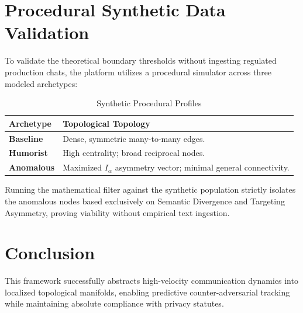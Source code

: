 \section{Procedural Synthetic Data Validation}

To validate the theoretical boundary thresholds without ingesting regulated production chats, the platform utilizes a procedural simulator across three modeled archetypes:

\begin{table}[h]
\centering
\begin{tabular}{p{2cm} p{5cm}}
\toprule
\textbf{Archetype} & \textbf{Topological Topology} \\
\midrule
\textbf{Baseline} & Dense, symmetric many-to-many edges. \\
\textbf{Humorist} & High centrality; broad reciprocal nodes. \\
\textbf{Anomalous} & Maximized $I_\alpha$ asymmetry vector; minimal general connectivity. \\
\bottomrule
\end{tabular}
\caption{Synthetic Procedural Profiles}
\end{table}

Running the mathematical filter against the synthetic population strictly isolates the anomalous nodes based exclusively on Semantic Divergence and Targeting Asymmetry, proving viability without empirical text ingestion.

\section{Conclusion}
This framework successfully abstracts high-velocity communication dynamics into localized topological manifolds, enabling predictive counter-adversarial tracking while maintaining absolute compliance with privacy statutes.
